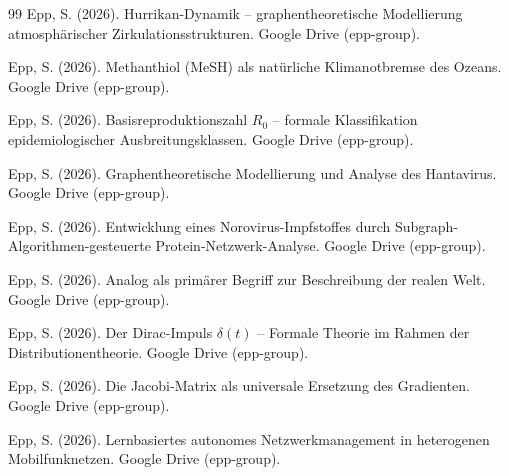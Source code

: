 ﻿\documentclass[a4paper,12pt]{article}
\theoremstyle{definition}
\begin{document}
\begin{thebibliography}{99}
Epp, S. (2026).
Hurrikan-Dynamik -- graphentheoretische Modellierung atmosph\"arischer Zirkulationsstrukturen.
Google Drive (epp-group).

Epp, S. (2026).
Methanthiol (MeSH) als nat\"urliche Klimanotbremse des Ozeans.
Google Drive (epp-group).

Epp, S. (2026).
Basisreproduktionszahl $R_0$ -- formale Klassifikation epidemiologischer Ausbreitungsklassen.
Google Drive (epp-group).

Epp, S. (2026).
Graphentheoretische Modellierung und Analyse des Hantavirus.
Google Drive (epp-group).

Epp, S. (2026).
Entwicklung eines Norovirus-Impfstoffes durch Subgraph-Algorithmen-gesteuerte
Protein-Netzwerk-Analyse.
Google Drive (epp-group).

Epp, S. (2026).
Analog als prim\"arer Begriff zur Beschreibung der realen Welt.
Google Drive (epp-group).

Epp, S. (2026).
Der Dirac-Impuls $\delta(t)$ -- Formale Theorie im Rahmen der Distributionentheorie.
Google Drive (epp-group).

Epp, S. (2026).
Die Jacobi-Matrix als universale Ersetzung des Gradienten.
Google Drive (epp-group).

Epp, S. (2026).
Lernbasiertes autonomes Netzwerkmanagement in heterogenen Mobilfunknetzen.
Google Drive (epp-group).

\end{thebibliography}
\end{document}
